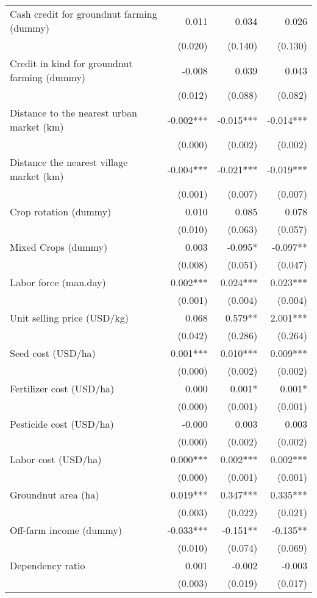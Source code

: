 \documentclass[
]{article}
\begin{document}
\begin{longtable}[t]{lrrr}
\addlinespace
Cash credit for groundnut farming (dummy) & 0.011 & 0.034 & 0.026\\
 & (0.020) & (0.140) & (0.130)\\
Credit in kind for groundnut farming (dummy) & -0.008 & 0.039 & 0.043\\
 & (0.012) & (0.088) & (0.082)\\
Distance to the nearest urban market (km) & -0.002*** & -0.015*** & -0.014***\\
\addlinespace
 & (0.000) & (0.002) & (0.002)\\
Distance the nearest village market (km) & -0.004*** & -0.021*** & -0.019***\\
 & (0.001) & (0.007) & (0.007)\\
Crop rotation (dummy) & 0.010 & 0.085 & 0.078\\
 & (0.010) & (0.063) & (0.057)\\
\addlinespace
Mixed Crops (dummy) & 0.003 & -0.095* & -0.097**\\
 & (0.008) & (0.051) & (0.047)\\
Labor force (man.day) & 0.002*** & 0.024*** & 0.023***\\
 & (0.001) & (0.004) & (0.004)\\
Unit selling price (USD/kg) & 0.068 & 0.579** & 2.001***\\
\addlinespace
 & (0.042) & (0.286) & (0.264)\\
Seed cost (USD/ha) & 0.001*** & 0.010*** & 0.009***\\
 & (0.000) & (0.002) & (0.002)\\
Fertilizer cost (USD/ha) & 0.000 & 0.001* & 0.001*\\
 & (0.000) & (0.001) & (0.001)\\
\addlinespace
Pesticide cost (USD/ha) & -0.000 & 0.003 & 0.003\\
 & (0.000) & (0.002) & (0.002)\\
Labor cost (USD/ha) & 0.000*** & 0.002*** & 0.002***\\
 & (0.000) & (0.001) & (0.001)\\
Groundnut area (ha) & 0.019*** & 0.347*** & 0.335***\\
\addlinespace
 & (0.003) & (0.022) & (0.021)\\
Off-farm income (dummy) & -0.033*** & -0.151** & -0.135**\\
 & (0.010) & (0.074) & (0.069)\\
Dependency ratio & 0.001 & -0.002 & -0.003\\
 & (0.003) & (0.019) & (0.017)\\

\end{longtable}
\end{document}
